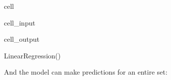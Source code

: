 \documentclass[letterpaper,10pt,english]{jupyterBook}
\begin{document}
\begin{sphinxuseclass}{cell}\begin{sphinxVerbatimInput}

\begin{sphinxuseclass}{cell_input}
\begin{sphinxVerbatim}[commandchars=\\\{\}]
 
\end{sphinxVerbatim}

\end{sphinxuseclass}\end{sphinxVerbatimInput}
\begin{sphinxVerbatimOutput}

\begin{sphinxuseclass}{cell_output}
\begin{sphinxVerbatim}[commandchars=\\\{\}]
LinearRegression()
\end{sphinxVerbatim}

\end{sphinxuseclass}\end{sphinxVerbatimOutput}

\end{sphinxuseclass}
\sphinxAtStartPar
And the model can make predictions for an entire set:
\end{document}
